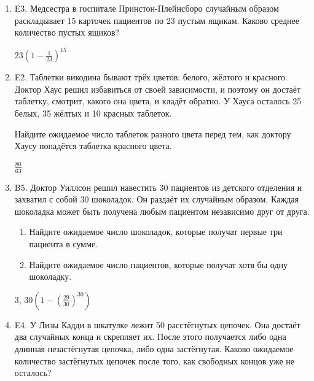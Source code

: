 \documentclass[12pt]{article}
\newenvironment{problem}{}{}
\newenvironment{sol}{}{} %
\begin{document}
\begin{enumerate}
\begin{problem}
\item[E3.] Медсестра в госпитале Принстон-Плейнсборо случайным образом раскладывает 15 карточек пациентов по 23 пустым ящикам. Каково среднее количество пустых ящиков?

\begin{sol}
$23 \left(1 - \frac{1}{23}\right)^{15}$
\end{sol}
\end{problem}

\begin{problem}
\item[E2.] Таблетки викодина бывают трёх цветов: белого, жёлтого и красного. Доктор Хаус решил избавиться от своей зависимости, и поэтому он достаёт таблетку, смотрит, какого она цвета, и кладёт обратно. У Хауса осталось 25 белых, 35 жёлтых и 10 красных таблеток.

Найдите ожидаемое число таблеток разного цвета перед тем, как доктору Хаусу попадётся таблетка красного цвета.

\begin{sol}
$\frac{80}{63}$
\end{sol}
\end{problem}

\begin{problem}
\item[B5.] Доктор Уиллсон решил навестить 30 пациентов из детского отделения и захватил с собой 30 шоколадок. Он раздаёт их случайным образом. Каждая шоколадка может быть получена любым пациентом независимо друг от друга. 
\begin{enumerate}
\item Найдите ожидаемое число шоколадок, которые получат первые три пациента в сумме. 
\item Найдите ожидаемое число пациентов, которые получат хотя бы одну шоколадку.
\end{enumerate}

\begin{sol}
$3$, $30 \left(1 - \left(\frac{29}{30}\right)^{30} \right)$
\end{sol}
\end{problem}

\begin{problem}
\item[E4.] У Лизы Кадди в шкатулке лежит 50 расстёгнутых цепочек. Она достаёт два случайных конца и скрепляет их. После этого получается либо одна длинная незастёгнутая цепочка, либо одна застёгнутая. Каково ожидаемое количество застёгнутых цепочек после того, как свободных концов уже не осталось?


\end{problem}
\end{enumerate}
\end{document}
